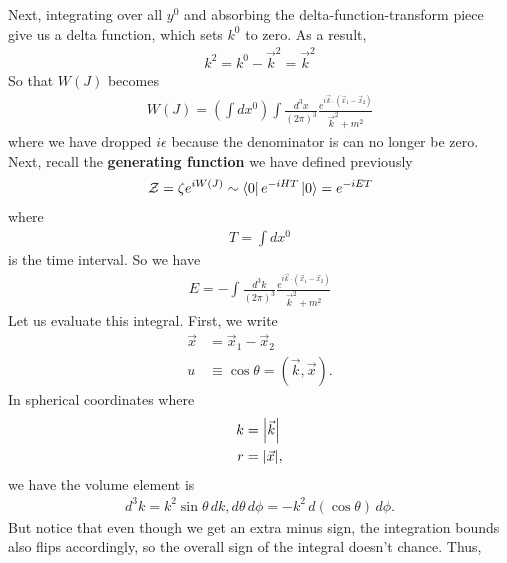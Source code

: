 \documentclass{book}
\theoremstyle{definition}
\newcommand{\f}[2]{\frac{#1}{#2}}
\newcommand{\lp}{\left(}
\newcommand{\rp}{\right)}
\begin{document}
Next, integrating over all $y^0$ and absorbing the delta-function-transform piece give us a delta function, which sets $k^0$ to zero. As a result,
\begin{align}
k^2 = k^0 - \vec{k}^2 = \vec{k}^2
\end{align}
So that $W(J)$ becomes
\begin{align}
W(J) = \lp \int dx^0 \rp \int \f{d^3x}{(2\pi)^3} \f{e^{i\vec{k}\cdot (\vec{x}_1 - \vec{x}_2)}}{\vec{k}^2 + m^2}
\end{align}
where we have dropped $i\epsilon$ because the denominator is can no longer be zero.   \\

Next, recall the \textbf{generating function} we have defined previously
\begin{align}
\mathcal{Z} = \zeta e^{iW(J)} \sim \bra{0}e^{-iHT}\ket{0} = e^{-iET}
\end{align} 
where
\begin{align}
T = \int dx^0
\end{align}
is the time interval. So we have 
\begin{align}
\boxed{E = -\int \f{d^3k}{(2\pi)^3}\f{e^{i\vec{k}\cdot(\vec{x}_1 - \vec{x}_2)}}{\vec{k}^2 + m^2}}
\end{align}
Let us evaluate this integral. First, we write 
\begin{align}
\vec{x} &= \vec{x}_1 - \vec{x}_2 \\ 
u &\equiv \cos\theta = (\vec{k},\vec{x}).
\end{align}
In spherical coordinates where
\begin{align}
k &= \abs{\vec{k}} \\
r &= \abs{\vec{x}},
\end{align}
we have the volume element is
\begin{align}
d^3k = k^2 \sin \theta \,dk,d\theta\,d\phi = -  k^2 \, d(\cos\theta)\,d\phi.
\end{align}
But notice that even though we get an extra minus sign, the integration bounds also flips accordingly, so the overall sign of the integral doesn't chance. Thus,
\end{document}
